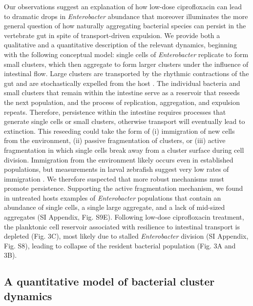 Our observations suggest an explanation of how low-dose ciprofloxacin can lead to dramatic drops in \textit{Enterobacter} abundance that moreover illuminates the more general question of how naturally aggregating bacterial species can persist in the vertebrate gut in spite of transport-driven expulsion. We provide both a qualitative and a quantitative description of the relevant dynamics, beginning with the following conceptual model: single cells of \textit{Enterobacter}  replicate to form small clusters, which then aggregate to form larger clusters under the influence of intestinal flow. Large clusters are transported by the rhythmic contractions of the gut \cite{Wiles2016,Logan2018,ganz2018} and are stochastically expelled from the host \cite{Wiles2016,Logan2018}. The individual bacteria and small clusters that remain within the intestine serve as a reservoir that reseeds the next population, and the process of replication, aggregation, and expulsion repeats. Therefore, persistence  within the intestine requires processes that generate single cells or small clusters, otherwise transport will eventually lead to extinction. This reseeding could take the form of (i) immigration of new cells from the environment, (ii) passive fragmentation of  clusters, or (iii) active fragmentation in which single cells break away from a cluster surface during cell division. Immigration from the environment likely occurs even in established populations, but measurements in larval zebrafish suggest very low rates of immigration \cite{robinson2018experimental}. We therefore suspected that more robust mechanisms must promote persistence. Supporting the active fragmentation mechanism, we found in untreated hosts examples of \textit{Enterobacter} populations that contain an abundance of single cells, a single large aggregate, and a lack of mid-sized aggregates (SI Appendix, Fig. S9E). Following low-dose ciprofloxacin treatment, the planktonic cell reservoir associated with resilience to intestinal transport is depleted (Fig. 3C), most likely due to stalled \textit{Enterobacter} division (SI Appendix, Fig. S8), leading to collapse of the resident bacterial population (Fig. 3A and 3B).




 \subsection{A quantitative model of bacterial cluster dynamics}

